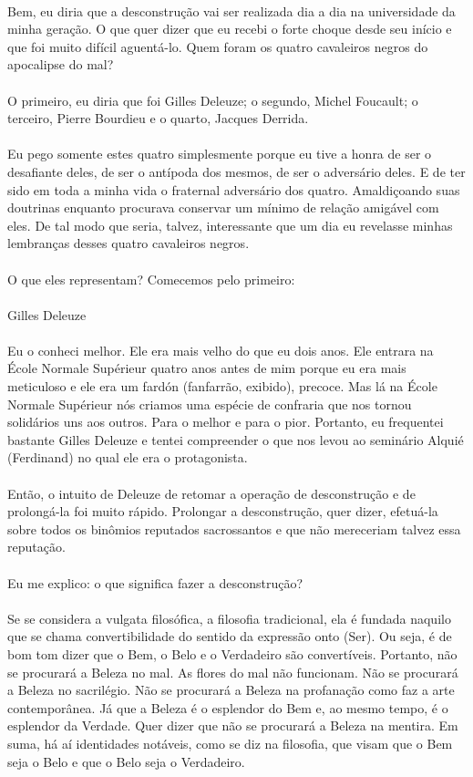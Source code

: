 \documentclass[10pt,a4paper]{book}
\begin{document}
	\\
	Bem, eu diria que a desconstrução vai ser realizada dia a dia na universidade da minha geração. O que quer dizer que eu recebi o forte choque desde seu início e que foi muito difícil aguentá-lo. Quem foram os quatro cavaleiros negros do apocalipse do mal?\\
	\\
	O primeiro, eu diria que foi Gilles Deleuze; o segundo, Michel Foucault; o terceiro, Pierre Bourdieu e o quarto, Jacques Derrida.\\
	\\
	Eu pego somente estes quatro simplesmente porque eu tive a honra de ser o desafiante deles, de ser o antípoda dos mesmos, de ser o adversário deles. E de ter sido em toda a minha vida o fraternal adversário dos quatro. Amaldiçoando suas doutrinas enquanto procurava conservar um mínimo de relação amigável com eles. De tal modo que seria, talvez, interessante que um dia eu revelasse minhas lembranças desses quatro cavaleiros negros.\\
	\\
	O que eles representam? Comecemos pelo primeiro:\\
	\\
	Gilles Deleuze\\
	\\
	Eu o conheci melhor. Ele era mais velho do que eu dois anos. Ele entrara na École Normale Supérieur quatro anos antes de mim porque eu era mais meticuloso e ele era um fardón (fanfarrão, exibido), precoce. Mas lá na École Normale Supérieur nós criamos uma espécie de confraria que nos tornou solidários uns aos outros. Para o melhor e para o pior. Portanto, eu frequentei bastante Gilles Deleuze e tentei compreender o que nos levou ao seminário Alquié (Ferdinand) no qual ele era o protagonista.\\
	\\
	Então, o intuito de Deleuze de retomar a operação de desconstrução e de prolongá-la foi muito rápido. Prolongar a desconstrução, quer dizer, efetuá-la sobre todos os binômios reputados sacrossantos e que não mereceriam talvez essa reputação.\\
	\\
	Eu me explico: o que significa fazer a desconstrução?\\
	\\
	Se se considera a vulgata filosófica, a filosofia tradicional, ela é fundada naquilo que se chama convertibilidade do sentido da expressão onto (Ser). Ou seja, é de bom tom dizer que o Bem, o Belo e o Verdadeiro são convertíveis. Portanto, não se procurará a Beleza no mal. As flores do mal não funcionam. Não se procurará a Beleza no sacrilégio. Não se procurará a Beleza na profanação como faz a arte contemporânea. Já que a Beleza é o esplendor do Bem e, ao mesmo tempo, é o esplendor da Verdade. Quer dizer que não se procurará a Beleza na mentira. Em suma, há aí identidades notáveis, como se diz na filosofia, que visam que o Bem seja o Belo e que o Belo seja o Verdadeiro.\\
\end{document}
